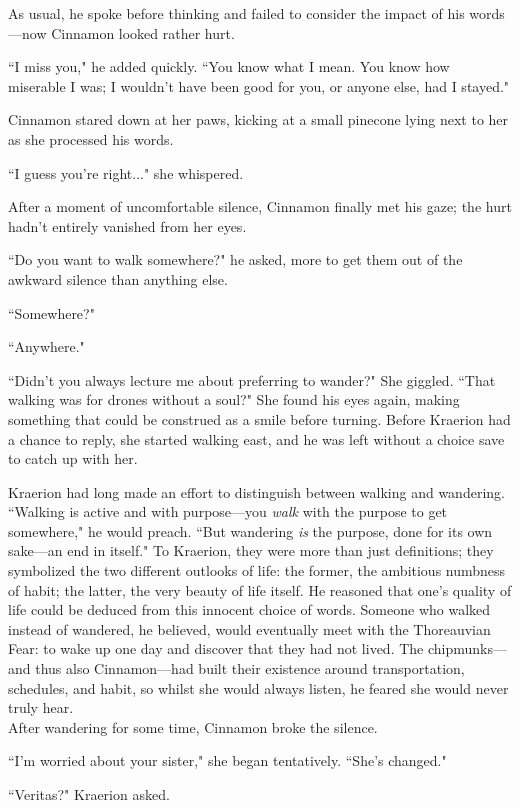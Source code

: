 As usual, he spoke before thinking and failed to consider the impact of his words---now Cinnamon looked rather hurt.

``I miss you," he added quickly.
``You know what I mean.
You know how miserable I was; I wouldn't have been good for you, or anyone else, had I stayed."

Cinnamon stared down at her paws, kicking at a small pinecone lying next to her as she processed his words.

``I guess you're right..." she whispered.

After a moment of uncomfortable silence, Cinnamon finally met his gaze; the hurt hadn't entirely vanished from her eyes.

``Do you want to walk somewhere?" he asked, more to get them out of the awkward silence than anything else.

``Somewhere?"

``Anywhere."

``Didn't you always lecture me about preferring to wander?" She giggled.
``That walking was for drones without a soul?" She found his eyes again, making something that could be construed as a smile before turning.
Before Kraerion had a chance to reply, she started walking east, and he was left without a choice save to catch up with her.

Kraerion had long made an effort to distinguish between walking and wandering.
``Walking is active and with purpose---you \textit{walk} with the purpose to get somewhere," he would preach.
``But wandering \textit{is} the purpose, done for its own sake---an end in itself."
To Kraerion, they were more than just definitions; they symbolized the two different outlooks of life: the former, the ambitious numbness of habit; the latter, the very beauty of life itself.
He reasoned that one's quality of life could be deduced from this innocent choice of words.
Someone who walked instead of wandered, he believed, would eventually meet with the Thoreauvian Fear: to wake up one day and discover that they had not lived.
The chipmunks---and thus also Cinnamon---had built their existence around transportation, schedules, and habit, so whilst she would always listen, he feared she would never truly hear.\\

After wandering for some time, Cinnamon broke the silence.

``I'm worried about your sister," she began tentatively.
``She's changed."

``Veritas?" Kraerion asked.

